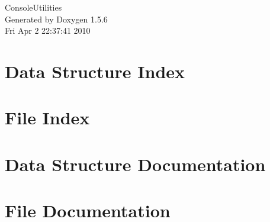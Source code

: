 \documentclass[a4paper]{article}
\begin{document}
\begin{titlepage}
\vspace*{7cm}
\begin{center}
{\Large ConsoleUtilities }\\
\vspace*{1cm}
{\large Generated by Doxygen 1.5.6}\\
\vspace*{0.5cm}
{\small Fri Apr 2 22:37:41 2010}\\
\end{center}
\end{titlepage}
\tableofcontents
{}
\section{Data Structure Index}

\section{File Index}

\section{Data Structure Documentation}


\section{File Documentation}


\printindex
\end{document}
